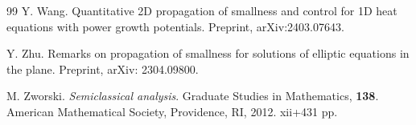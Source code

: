 \documentclass[a4paper,reqno]{amsart}
\theoremstyle{definition}
\numberwithin{equation}{section}
\begin{document}
\begin{thebibliography}{99}
 Y. Wang.
 Quantitative 2D propagation of smallness and control for 1D heat equations with power growth potentials.
 Preprint, arXiv:2403.07643.

 
		Y. Zhu.
		Remarks on propagation of smallness for solutions of elliptic equations in the plane.
		Preprint, arXiv: 2304.09800.

           M. Zworski.
           \emph{Semiclassical analysis}. Graduate Studies in Mathematics, \textbf{138}. American Mathematical Society, Providence, RI, 2012. xii+431 pp.    

  
	\end{thebibliography}
\end{document}
